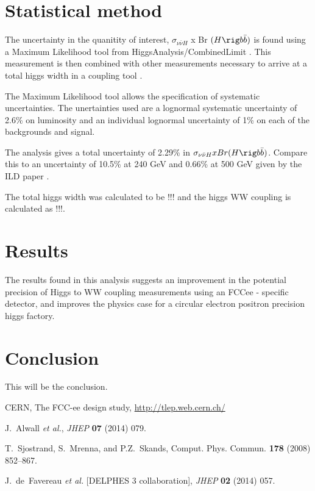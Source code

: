 \documentclass[preprintnumbers,nofootinbib,noshowpacs,eqsecnum,prd,superscriptaddress,letterpaper]{revtex4}
\begin{document}
\section{Statistical method}
\label{sec:method}

The uncertainty in the quanitity of interest, $\sigma_{\nu\bar{\nu}H}$ x Br $(H \rig b\bar{b})$ is found using a Maximum Likelihood tool from HiggsAnalysis/CombinedLimit \cite{higgsanalysis}. This measurement is then combined with other measurements necessary to arrive at a total higgs width in a coupling tool \cite{couplingtool}.

The Maximum Likelihood tool allows the specification of systematic uncertainties. The unertainties used are a lognormal systematic uncertainty of 2.6\% on luminosity and an individual lognormal uncertainty of 1\% on each of the backgrounds and signal.

The analysis gives a total uncertainty of 2.29\% in $\sigma_{\nu\bar{\nu}H} x Br(H \rig b\bar{b})$. Compare this to an uncertainty of 10.5\% at 240 GeV and 0.66\% at 500 GeV given by the ILD paper \cite{ILD}.

The total higgs width was calculated to be !!! and the higgs WW coupling is calculated as !!!.

\section{Results}
\label{sec:results}

The results found in this analysis suggests an improvement in the potential precision of Higgs to WW coupling measurements using an FCCee - specific detector, and improves the physics case for a circular electron positron precision higgs factory. 

\section{Conclusion}
\label{sec:conclusion}


This will be the conclusion.

\clearpage

\begin{thebibliography}{99}

   CERN, The FCC-ee design study, \url{http://tlep.web.cern.ch/}
  
   J.~Alwall {\it et al.},
   {\it JHEP} {\bf 07} (2014) 079.
  
   T.~Sjostrand, S.~Mrenna, and P.Z.~Skands,
   Comput. Phys. Commun. {\bf 178} (2008) 852–867.
 
   J.~de~Favereau {\it et al.} [DELPHES 3 collaboration],
   {\it JHEP} {\bf 02} (2014) 057.
  

\end{thebibliography}
\end{document}
